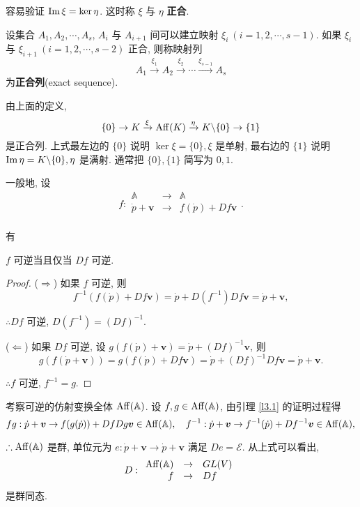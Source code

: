 \documentclass[color=black,device=normal,lang=cn,mode=geye]{elegantnote}
\begin{document}
容易验证 $\operatorname{Im} \xi=\ker\eta$. 这时称 $\xi$ 与 $\eta$ \textbf{正合}.
\begin{definition}
    设集合 $A_1,A_2,\cdots,A_s$, $A_i$ 与 $A_{i+1}$ 间可以建立映射 $\xi_i\ (i=1,2,\cdots,s-1)$. 如果 $\xi_i$ 与 $\xi_{i+1}\ (i=1,2,\cdots,s-2)$ 正合, 则称映射列
    \[A_1\xrightarrow{\xi_1}A_2\xrightarrow{\xi_2}\cdots\xrightarrow{\xi_{s-1}}A_s\]
    为\textbf{正合列}(exact sequence).
\end{definition}
由上面的定义,
\[\{0\}\to K\xrightarrow{\xi}\operatorname{Aff} (K)\xrightarrow{\eta}K\backslash\{0\}\to\{1\}\]
是正合列. 上式最左边的 $\{0\}$ 说明 $\ker\xi=\{0\},\xi$ 是单射, 最右边的 $\{1\}$ 说明 $\operatorname{Im} \eta=K\backslash\{0\},\eta$ 是满射. 通常把 $\{0\},\{1\}$ 简写为 $0,1$.

一般地, 设
\[f:\begin{array}{rcl}
    \mathbb{A} & \to & \mathbb{A} \\
    \dot{p}+\boldsymbol{v} & \to & f(\dot{p})+Df\boldsymbol{v} \\
\end{array}.\]

有
\begin{lemma}\label{l3.1}
    $f$ 可逆当且仅当 $Df$ 可逆.
\end{lemma}
\begin{proof}
    ($\Rightarrow$) 如果 $f$ 可逆, 则
    \[f^{-1}(f(\dot{p})+Df\boldsymbol{v})=\dot{p}+D(f^{-1})Df\boldsymbol{v}=\dot{p}+\boldsymbol{v},\]

    $\therefore Df$ 可逆, $D(f^{-1})=(Df)^{-1}$.

    ($\Leftarrow$) 如果 $Df$ 可逆, 设 $g(f(\dot{p})+\boldsymbol{v})=\dot{p}+(Df)^{-1}\boldsymbol{v}$, 则
    \[g(f(\dot{p}+\boldsymbol{v}))=g(f(\dot{p})+Df\boldsymbol{v})=\dot{p}+(Df)^{-1}Df\boldsymbol{v}=\dot{p}+\boldsymbol{v}.\]

    $\therefore f$ 可逆, $f^{-1}=g$.
\end{proof}
考察可逆的仿射变换全体 $\operatorname{Aff} (\mathbb{A})$. 设 $f,g\in\operatorname{Aff} (\mathbb{A})$, 由引理 \ref{l3.1} 的证明过程得
\[fg:\dot{p}+\boldsymbol{v}\to f(g(\dot{p}))+DfDg\boldsymbol{v}\in\operatorname{Aff} (\mathbb{A}),\quad f^{-1}:\dot{p}+\boldsymbol{v}\to f^{-1}(\dot{p})+Df^{-1}\boldsymbol{v}\in\operatorname{Aff} (\mathbb{A}),\]

$\therefore\operatorname{Aff} (\mathbb{A})$ 是群, 单位元为 $e:\dot{p}+\boldsymbol{v}\to\dot{p}+\boldsymbol{v}$ 满足 $De=\mathcal{E}$. 从上式可以看出,
\[D:\begin{array}{rcl}
    \operatorname{Aff} (\mathbb{A}) & \to & GL (V) \\
    f & \to & Df \\
\end{array}\]
是群同态.
\end{document}
